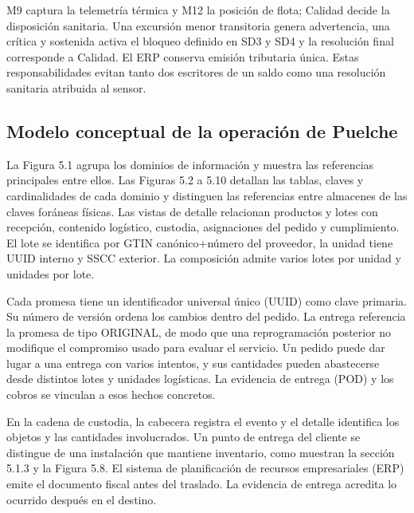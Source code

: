 M9 captura la telemetría térmica y M12 la posición de flota; Calidad decide la disposición sanitaria. Una excursión menor transitoria genera advertencia, una crítica y sostenida activa el bloqueo definido en SD3 y SD4 y la resolución final corresponde a Calidad. El ERP conserva emisión tributaria única. Estas responsabilidades evitan tanto dos escritores de un saldo como una resolución sanitaria atribuida al sensor.

\subsection{Modelo conceptual de la operación de Puelche}
\label{sec:sd5-5-1-2}

La Figura 5.1 agrupa los dominios de información y muestra las referencias principales entre ellos. Las Figuras 5.2 a 5.10 detallan las tablas, claves y cardinalidades de cada dominio y distinguen las referencias entre almacenes de las claves foráneas físicas. Las vistas de detalle relacionan productos y lotes con recepción, contenido logístico, custodia, asignaciones del pedido y cumplimiento. El lote se identifica por GTIN canónico+número del proveedor, la unidad tiene UUID interno y SSCC exterior. La composición admite varios lotes por unidad y unidades por lote.

\FloatBarrier

Cada promesa tiene un identificador universal único (UUID) como clave primaria. Su número de versión ordena los cambios dentro del pedido. La entrega referencia la promesa de tipo ORIGINAL, de modo que una reprogramación posterior no modifique el compromiso usado para evaluar el servicio. Un pedido puede dar lugar a una entrega con varios intentos, y sus cantidades pueden abastecerse desde distintos lotes y unidades logísticas. La evidencia de entrega (POD) y los cobros se vinculan a esos hechos concretos.

En la cadena de custodia, la cabecera registra el evento y el detalle identifica los objetos y las cantidades involucrados. Un punto de entrega del cliente se distingue de una instalación que mantiene inventario, como muestran la sección 5.1.3 y la Figura 5.8. El sistema de planificación de recursos empresariales (ERP) emite el documento fiscal antes del traslado. La evidencia de entrega acredita lo ocurrido después en el destino.

